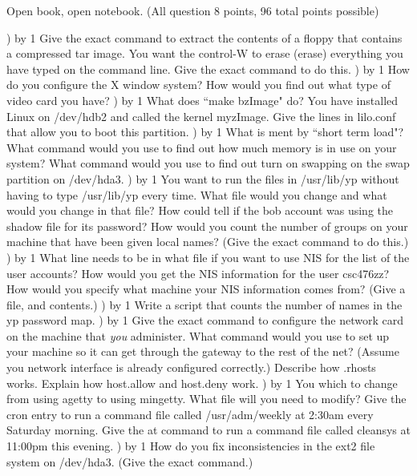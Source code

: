 
\parindent=0in
\nopagenumbers
\newcount\quesno
{}
\def\ques{\number\quesno) \advance\quesno by 1}
\def\aspace{\vskip 1.5in}

Open book, open notebook. (All question 8 points, 96 total points possible)

\ques
Give the exact command to extract the contents of a floppy that
contains a compressed tar image.
\vskip 0.5in
You want the control-W to erase ({\ltt{}erase}) everything you have typed on
the command line.
Give the exact command to do this.
\vskip 0.5in
\ques
How do you configure the X window system?
\vskip 1.0in
How would you find out what type of video card you have?
\vskip 1.0in
\ques
What does ``{\ltt{}make bzImage}" do?
\vskip 1.0in
You have installed Linux on {\ltt{}/dev/hdb2} and called the
kernel {\ltt{}myzImage}. Give the lines in {\ltt{}lilo.conf} that
allow you to boot this partition.
\vskip 1.8in
\vfill\eject
\ques
What is ment by ``short term load"?
\vskip 0.7in
What command would you use to find out how much memory is in use
on your system?
\vskip 0.5in
What command would you use to find out turn on swapping
on the swap partition on {\ltt{}/dev/hda3}.
\vskip 0.5in
\ques
You want to run the files in {\ltt{}/usr/lib/yp} without
having to type {\ltt{}/usr/lib/yp} every time.
What file would you change and what would you change in that file?
\vskip 0.8in
How could tell if the {\ltt{}bob} account was using the shadow file
for its password?
\vskip 0.5in
How would you count the number of groups on your machine
that have been given local names?
(Give the exact command to do this.)
\vskip 0.5in
\ques
What line needs to be in what file if you want to use NIS
for the list of the user accounts?
\vskip 0.5in
How would you get the NIS information for the user
csc476zz?
\vskip 0.5in
How would you specify what machine your NIS information comes from?
(Give a file, and contents.)
\vskip 0.5in
\ques
Write a script that counts the number of names in the yp password map.
\vfill\eject
\ques
Give the exact command to configure the network card on the machine
that {\it you} administer.
\vskip 0.5in
What command would you use to set up your machine so
it can get through the gateway to the rest of the net?
(Assume you network interface is already configured correctly.)
\vskip 0.5in
Describe how {\ltt{}.rhosts} works.
\vskip 1.0in
Explain how {\ltt{}host.allow} and {\ltt{}host.deny} work.
\vskip 1.0in
\ques
You which to change from using {\ltt{}agetty} to using {\ltt{}mingetty}.
What file will you need to modify?
\vskip 0.5in
Give the cron entry to run a command file called {\ltt{}/usr/adm/weekly}
at 2:30am every Saturday morning.
\vskip 0.5in
Give the at command to run a command file called {\ltt{}cleansys}
at 11:00pm this evening.
\vskip 0.5in
\ques
How do you fix inconsistencies in the ext2 file system on {\ltt{}/dev/hda3}.
(Give the exact command.)
\vskip 0.6in


